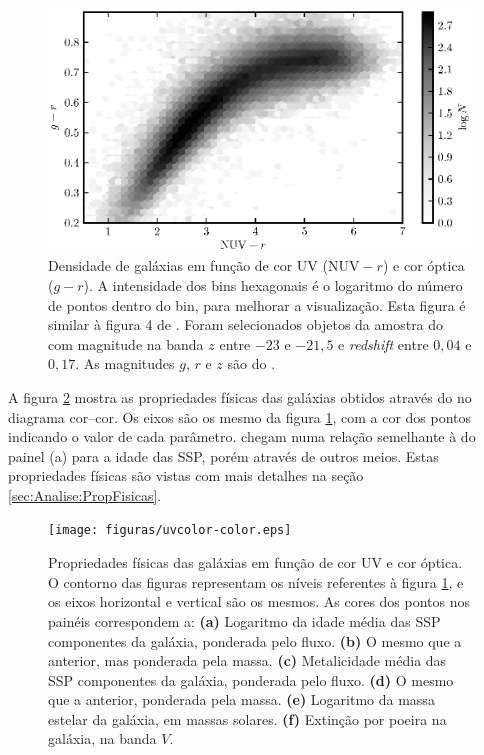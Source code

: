 \begin{figure}
	\includegraphics{figuras/uvcolor-color-density.eps}
	\caption[Densidade de galáxias no diagrama cor--cor UV.]
	{Densidade de galáxias em função de cor UV ($\mathrm{NUV}-r$) e cor óptica
	($g-r$). A intensidade dos bins hexagonais é o logaritmo do número de pontos
	dentro do bin, para melhorar a visualização. Esta figura é similar à figura 4
	de \citet{Chilingarian2011}. Foram selecionados objetos da amostra do
	\starlight com magnitude na banda $z$ entre $-23$ e $-21,5$ e {\em redshift}
	entre $0,04$ e $0,17$. As magnitudes $g$, $r$ e $z$ são do \SDSS.}
	\label{fig:DensityColor}
\end{figure}

A figura \ref{fig:ColorStarlightParam} mostra as propriedades físicas das
galáxias obtidos através do \starlight no diagrama cor--cor. Os eixos são os
mesmo da figura \ref{fig:DensityColor}, com a cor dos pontos indicando o valor
de cada parâmetro. \citeauthor{Chilingarian2011} chegam numa relação semelhante
à do painel (a) para a idade das SSP, porém através de outros meios. Estas
propriedades físicas são vistas com mais detalhes na seção
\ref{sec:Analise:PropFisicas}.

\begin{figure}
	\texttt{[image: figuras/uvcolor-color.eps]}
	\caption[Diagrama cor--cor UV para os diversos parâmetros \starlight.]
	{Propriedades físicas das galáxias em função de cor UV e cor óptica. O contorno
	das figuras representam os níveis referentes à figura \ref{fig:DensityColor},
	e os eixos horizontal e vertical são os mesmos. As cores dos pontos nos painéis
	correspondem a: \textbf{(a)} Logaritmo da idade média das SSP componentes da
	galáxia, ponderada pelo fluxo. \textbf{(b)} O mesmo que a anterior, mas
	ponderada pela massa. \textbf{(c)} Metalicidade média das SSP componentes da
	galáxia, ponderada pelo fluxo. \textbf{(d)} O mesmo que a anterior, ponderada
	pela massa. \textbf{(e)} Logaritmo da massa estelar da galáxia, em massas
	solares. \textbf{(f)} Extinção por poeira na galáxia, na banda $V$.}
	\label{fig:ColorStarlightParam}
\end{figure}


